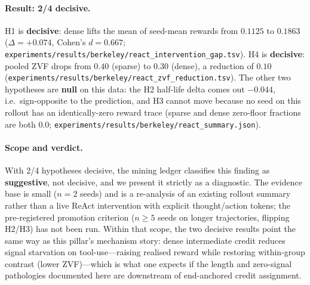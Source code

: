 \paragraph{Result: 2/4 decisive.}
H1 is \textbf{decisive}: dense lifts the mean of seed-mean
rewards from $0.1125$ to $0.1863$ ($\Delta = +0.074$, Cohen's
$d = 0.667$;
\texttt{experiments/results/berkeley/react\_intervention\_gap.tsv}).
H4 is \textbf{decisive}: pooled ZVF drops from $0.40$ (sparse)
to $0.30$ (dense), a reduction of $0.10$
(\texttt{experiments/results/berkeley/react\_zvf\_reduction.tsv}).
The other two hypotheses are \textbf{null} on this data: the H2
half-life delta comes out $-0.044$, i.e.\ sign-opposite to the
prediction, and H3 cannot move because no seed on this rollout
has an identically-zero reward trace (sparse and dense zero-floor
fractions are both $0.0$;
\texttt{experiments/results/berkeley/react\_summary.json}).

\paragraph{Scope and verdict.}
With 2/4 hypotheses decisive, the mining ledger classifies this
finding as \textbf{suggestive}, not decisive, and we present it
strictly as a diagnostic. The evidence base is small ($n{=}2$
seeds) and is a re-analysis of an existing rollout summary
rather than a live ReAct intervention with explicit
thought/action tokens; the pre-registered promotion criterion
($n \ge 5$ seeds on longer trajectories, flipping H2/H3) has not
been run. Within that scope, the two decisive results point the
same way as this pillar's mechanism story: dense intermediate
credit reduces signal starvation on tool-use---raising realised
reward while restoring within-group contrast (lower ZVF)---which
is what one expects if the length and zero-signal pathologies
documented here are downstream of end-anchored credit
assignment.
